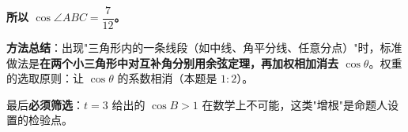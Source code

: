 \begin{answer}
\textbf{所以 $\cos\angle ABC=\dfrac7{12}$。}

\begin{gktip}
\textbf{方法总结}：出现"三角形内的一条线段（如中线、角平分线、任意分点）"时，标准做法是\textbf{在两个小三角形中对互补角分别用余弦定理，再加权相加消去 $\cos\theta$}。权重的选取原则：让 $\cos\theta$ 的系数相消（本题是 $1:2$）。

最后\textbf{必须筛选}：$t=3$ 给出的 $\cos B>1$ 在数学上不可能，这类"增根"是命题人设置的检验点。
\end{gktip}



\par\medskip

\end{answer}
